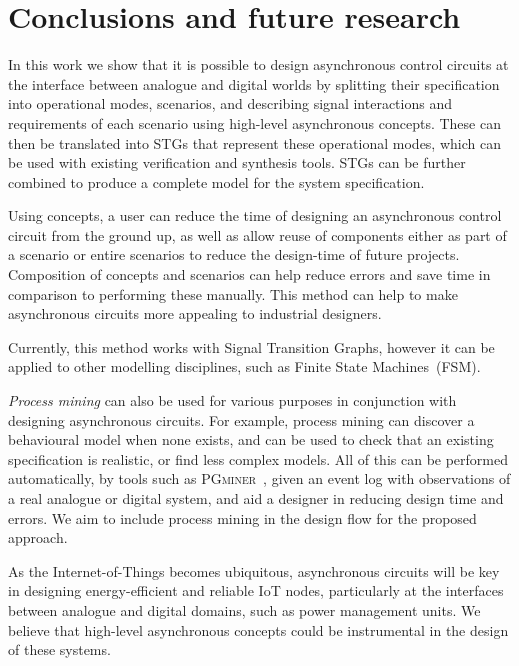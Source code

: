\documentclass[british, journal]{IEEEtran}
\newcommand{\noun}[1]{\textsc{#1}}
\begin{document}
\section{Conclusions and future research\label{sec:conclusions}}

In this work we show that it is possible to design asynchronous control
circuits at the interface between analogue and digital worlds by
splitting their specification into operational modes, scenarios, and
describing signal interactions and requirements of each scenario using
high-level asynchronous concepts. These can then be translated into STGs
that represent these operational modes, which can be used with existing
verification and synthesis tools. STGs can be further combined to
produce a complete model for the system specification.

Using concepts, a user can reduce the time of designing an asynchronous
control circuit from the ground up, as well as allow reuse of components
either as part of a scenario or entire scenarios to reduce the design-time
of future projects. Composition of concepts and scenarios can help
reduce errors and save time in comparison to performing these manually.
This method can help to make asynchronous circuits more appealing
to industrial designers.

Currently, this method works with Signal Transition Graphs, however
it can be applied to other modelling disciplines, such as Finite State
Machines~(FSM).

\emph{Process mining} can also be used for various purposes in conjunction
with designing asynchronous circuits. For example, process mining can discover a
behavioural model when none exists, and can be used to check that an existing
specification is realistic, or find less complex models. All of this can be
performed automatically, by tools such as \noun{PGminer}~\cite{mokhov2016mining}, given
an event log with observations of a real analogue or digital system, and aid a
designer in reducing design time and errors. We aim to include process mining
in the design flow for the proposed approach.


As the Internet-of-Things becomes ubiquitous, asynchronous circuits
will be key in designing energy-efficient and reliable IoT nodes,
particularly at the interfaces between analogue and digital domains,
such as power management units. We believe that high-level asynchronous
concepts could be instrumental in the design of these systems.
\end{document}
